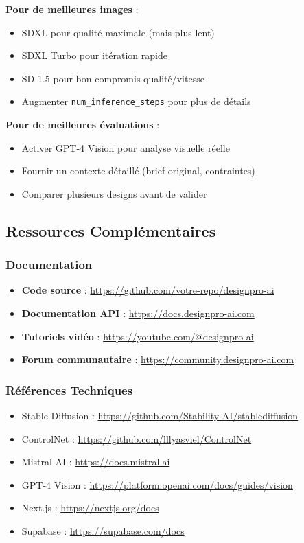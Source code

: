 \textbf{Pour de meilleures images} :
\begin{itemize}
    \item SDXL pour qualité maximale (mais plus lent)
    \item SDXL Turbo pour itération rapide
    \item SD 1.5 pour bon compromis qualité/vitesse
    \item Augmenter \texttt{num\_inference\_steps} pour plus de détails
\end{itemize}

\textbf{Pour de meilleures évaluations} :
\begin{itemize}
    \item Activer GPT-4 Vision pour analyse visuelle réelle
    \item Fournir un contexte détaillé (brief original, contraintes)
    \item Comparer plusieurs designs avant de valider
\end{itemize}

\subsection{Ressources Complémentaires}

\subsubsection{Documentation}

\begin{itemize}
    \item \textbf{Code source} : \url{https://github.com/votre-repo/designpro-ai}
    \item \textbf{Documentation API} : \url{https://docs.designpro-ai.com}
    \item \textbf{Tutoriels vidéo} : \url{https://youtube.com/@designpro-ai}
    \item \textbf{Forum communautaire} : \url{https://community.designpro-ai.com}
\end{itemize}

\subsubsection{Références Techniques}

\begin{itemize}
    \item Stable Diffusion : \url{https://github.com/Stability-AI/stablediffusion}
    \item ControlNet : \url{https://github.com/lllyasviel/ControlNet}
    \item Mistral AI : \url{https://docs.mistral.ai}
    \item GPT-4 Vision : \url{https://platform.openai.com/docs/guides/vision}
    \item Next.js : \url{https://nextjs.org/docs}
    \item Supabase : \url{https://supabase.com/docs}
\end{itemize}

